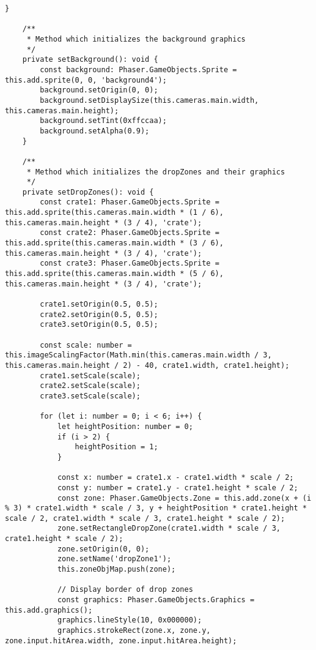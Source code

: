 \begin{lstlisting}[style=TypeScript, caption={restrictedSortingScene.ts}]
    }

    /**
     * Method which initializes the background graphics
     */
    private setBackground(): void {
        const background: Phaser.GameObjects.Sprite = this.add.sprite(0, 0, 'background4');
        background.setOrigin(0, 0);
        background.setDisplaySize(this.cameras.main.width, this.cameras.main.height);
        background.setTint(0xffccaa);
        background.setAlpha(0.9);
    }

    /**
     * Method which initializes the dropZones and their graphics
     */
    private setDropZones(): void {
        const crate1: Phaser.GameObjects.Sprite = this.add.sprite(this.cameras.main.width * (1 / 6), this.cameras.main.height * (3 / 4), 'crate');
        const crate2: Phaser.GameObjects.Sprite = this.add.sprite(this.cameras.main.width * (3 / 6), this.cameras.main.height * (3 / 4), 'crate');
        const crate3: Phaser.GameObjects.Sprite = this.add.sprite(this.cameras.main.width * (5 / 6), this.cameras.main.height * (3 / 4), 'crate');

        crate1.setOrigin(0.5, 0.5);
        crate2.setOrigin(0.5, 0.5);
        crate3.setOrigin(0.5, 0.5);

        const scale: number = this.imageScalingFactor(Math.min(this.cameras.main.width / 3, this.cameras.main.height / 2) - 40, crate1.width, crate1.height);
        crate1.setScale(scale);
        crate2.setScale(scale);
        crate3.setScale(scale);

        for (let i: number = 0; i < 6; i++) {
            let heightPosition: number = 0;
            if (i > 2) {
                heightPosition = 1;
            }

            const x: number = crate1.x - crate1.width * scale / 2;
            const y: number = crate1.y - crate1.height * scale / 2;
            const zone: Phaser.GameObjects.Zone = this.add.zone(x + (i % 3) * crate1.width * scale / 3, y + heightPosition * crate1.height * scale / 2, crate1.width * scale / 3, crate1.height * scale / 2);
            zone.setRectangleDropZone(crate1.width * scale / 3, crate1.height * scale / 2);
            zone.setOrigin(0, 0);
            zone.setName('dropZone1');
            this.zoneObjMap.push(zone);

            // Display border of drop zones
            const graphics: Phaser.GameObjects.Graphics = this.add.graphics();
            graphics.lineStyle(10, 0x000000);
            graphics.strokeRect(zone.x, zone.y, zone.input.hitArea.width, zone.input.hitArea.height);


\end{lstlisting}
